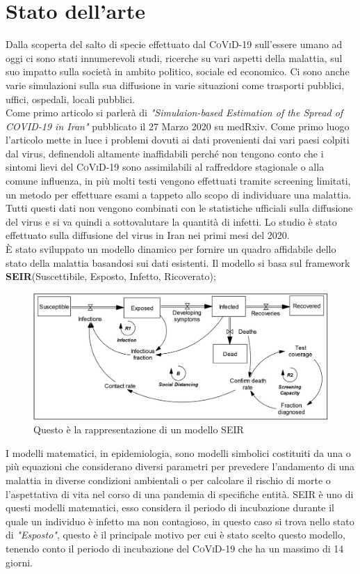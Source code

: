 \documentclass[12pt, openany]{book}
\begin{document}
	\chapter{Stato dell'arte}
		Dalla scoperta del salto di specie effettuato dal \textsc{CoViD-19} sull'essere umano ad oggi ci sono stati innumerevoli studi, ricerche su vari aspetti della malattia, sul suo impatto sulla società in ambito politico, sociale ed economico. Ci sono anche varie simulazioni sulla sua diffusione in varie situazioni come trasporti pubblici, uffici, ospedali, locali pubblici. \\
		Come primo articolo si parlerà di \emph{"Simulaion-based Estimation of the Spread of COVID-19 in Iran"} \cite{Iran} pubblicato il 27 Marzo 2020 su medRxiv. Come primo luogo l'articolo mette in luce i problemi dovuti ai dati provenienti dai vari paesi colpiti dal virus, definendoli altamente inaffidabili perché non tengono conto che i sintomi lievi del \textsc{CoViD-19} sono assimilabili al raffreddore stagionale o alla comune influenza, in più molti testi vengono effettuati tramite screening limitati, un metodo per effettuare esami a tappeto allo scopo di individuare una malattia. Tutti questi dati non vengono combinati con le statistiche ufficiali sulla diffusione del virus e si va quindi a sottovalutare la quantità di infetti.
		Lo studio è stato effettuato sulla diffusione del virus in Iran nei primi mesi del 2020.\\
		È stato sviluppato un modello dinamico per fornire un quadro affidabile dello stato della malattia basandosi sui dati esistenti. Il modello si basa sul framework \textbf{SEIR}(Suscettibile, Esposto, Infetto, Ricoverato); 
		\begin{figure}[H]
			\centering
			\includegraphics[width=1\linewidth]{"Immagini/SEIR"}
			\caption{Questo è la rappresentazione di un modello SEIR }
			\label{fig:SEIR}
		\end{figure}
		I modelli matematici, in epidemiologia, sono modelli simbolici costituiti da una o più equazioni che considerano diversi parametri per prevedere l'andamento di una malattia in diverse condizioni ambientali o per calcolare il rischio di morte o l'aspettativa di vita nel corso di una pandemia di specifiche entità. SEIR è uno di questi modelli matematici, esso considera il periodo di incubazione durante il quale un individuo è infetto ma non contagioso, in questo caso si trova nello stato di \emph{"Esposto"}, questo è il principale motivo per cui è stato scelto questo modello, tenendo conto il periodo di incubazione del \textsc{CoViD-19} che ha un massimo di 14 giorni.\\
\end{document}
